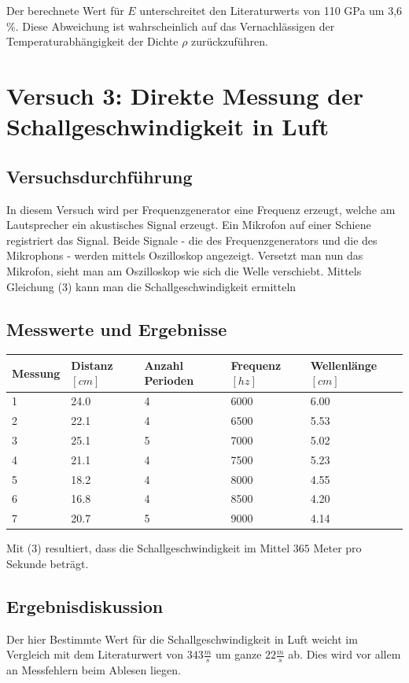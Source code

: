 \documentclass{scrartcl}
\begin{document}
Der berechnete Wert für $E$ unterschreitet den Literaturwerts von 110 GPa um 3,6 \%. Diese Abweichung ist wahrscheinlich auf das Vernachlässigen der Temperaturabhängigkeit der Dichte $\rho$ zurückzuführen.


\section{Versuch 3: Direkte Messung der Schallgeschwindigkeit in Luft}
\subsection{Versuchsdurchführung}
In diesem Versuch wird per Frequenzgenerator eine Frequenz erzeugt, welche am Lautsprecher ein akustisches Signal erzeugt. Ein Mikrofon auf einer Schiene registriert das Signal. Beide Signale - die des Frequenzgenerators und die des Mikrophons - werden mittels Oszilloskop angezeigt. 
Versetzt man nun das Mikrofon, sieht man am Oszilloskop wie sich die Welle verschiebt.
Mittels Gleichung (3) kann man die Schallgeschwindigkeit ermitteln
\subsection{Messwerte und Ergebnisse}
\begin{table}[H]
\begin{tabular}{l|l|l|l|l}
Messung & Distanz $[cm]$ & Anzahl Perioden & Frequenz $[hz]$ & Wellenlänge $[cm]$ \\ \hline
1       & 24.0          & 4 & 6000 & 6.00\\
2       & 22.1          & 4 & 6500 & 5.53\\
3       & 25.1          & 5 & 7000 & 5.02\\
4       & 21.1          & 4 & 7500 & 5.23\\
5       & 18.2          & 4 & 8000 & 4.55\\
6       & 16.8          & 4 & 8500 & 4.20\\
7       & 20.7          & 5 & 9000 & 4.14\\
\end{tabular}
\end{table}
Mit (3) resultiert, dass die Schallgeschwindigkeit im Mittel $365$ Meter pro Sekunde beträgt.
\subsection{Ergebnisdiskussion}
Der hier Bestimmte Wert für die Schallgeschwindigkeit in Luft weicht im  Vergleich mit dem Literaturwert von $343 \frac{m}{s}$ um ganze $22\frac{m}{s}$ ab. Dies wird vor allem an Messfehlern beim Ablesen liegen.
\end{document}
